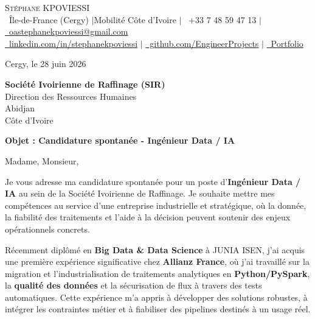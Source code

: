 \documentclass[letterpaper,11pt]{article}
\begin{document}
\begin{center}
    {\Huge \scshape \color{primary} Stéphane KPOVIESSI} \\ \vspace{4pt}
    \small
    {\color{primary}\faMapMarker}~Île-de-France (Cergy) \enspace$|$\enspace Mobilité Côte d'Ivoire \enspace$|$\enspace
    {\color{primary}\faPhone}~+33 7 48 59 47 13 \enspace$|$\enspace
    \href{mailto:oastephanekpoviessi@gmail.com}{\faEnvelope~oastephanekpoviessi@gmail.com} \\ \vspace{3pt}
    \href{https://linkedin.com/in/stephanekpoviessi}{\faLinkedin~linkedin.com/in/stephanekpoviessi} \enspace$|$\enspace
    \href{https://github.com/EngineerProjects}{\faGithub~github.com/EngineerProjects} \enspace$|$\enspace
    \href{https://kpoviessi-stephane.vercel.app/}{\faUser~Portfolio}
\end{center}

\vspace{0.2cm}

\begin{flushright}
Cergy, le 28 juin 2026

\vspace{0.25cm}
\textbf{Société Ivoirienne de Raffinage (SIR)} \\
Direction des Ressources Humaines \\
Abidjan \\
Côte d'Ivoire
\end{flushright}

\vspace{0.3cm}

\textbf{Objet : Candidature spontanée - Ingénieur Data / IA}

\vspace{0.4cm}

Madame, Monsieur,

Je vous adresse ma candidature spontanée pour un poste d'\textbf{Ingénieur Data / IA} au sein de la Société Ivoirienne de Raffinage. Je souhaite mettre mes compétences au service d'une entreprise industrielle et stratégique, où la donnée, la fiabilité des traitements et l'aide à la décision peuvent soutenir des enjeux opérationnels concrets.

Récemment diplômé en \textbf{Big Data \& Data Science} à JUNIA ISEN, j'ai acquis une première expérience significative chez \textbf{Allianz France}, où j'ai travaillé sur la migration et l'industrialisation de traitements analytiques en \textbf{Python/PySpark}, la \textbf{qualité des données} et la sécurisation de flux à travers des tests automatiques. Cette expérience m'a appris à développer des solutions robustes, à intégrer les contraintes métier et à fiabiliser des pipelines destinés à un usage réel.
\end{document}
